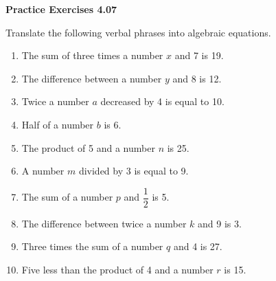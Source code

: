 \vspace{0.3ex}
\noindent\textbf{Practice Exercises 4.07}

\vspace{0.2ex}

Translate the following verbal phrases into algebraic equations.

\begin{enumerate}
    \item The sum of three times a number \(x\) and 7 is 19.  
    \item The difference between a number \(y\) and 8 is 12.  
    \item Twice a number \(a\) decreased by 4 is equal to 10.  
    \item Half of a number \(b\) is 6.  
    \item The product of 5 and a number \(n\) is 25.  
    \item A number \(m\) divided by 3 is equal to 9.  
    \item The sum of a number \(p\) and \(\dfrac{1}{2}\) is 5.  
    \item The difference between twice a number \(k\) and 9 is 3.  
    \item Three times the sum of a number \(q\) and 4 is 27.  
    \item Five less than the product of 4 and a number \(r\) is 15.  
\end{enumerate}

